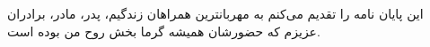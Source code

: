 \begin{acknowledgementpage}

\vspace{1.5cm}

{\nastaliq
{
    این پایان نامه را تقدیم می‌کنم به مهربانترين همراهان زندگیم، پدر، مادر، برادران عزیزم که حضورشان همیشه گرما بخش روح من بوده است.
 }}\end{acknowledgementpage}
\newpage